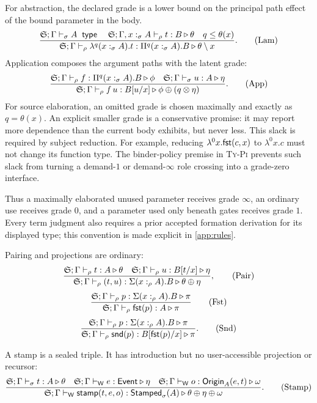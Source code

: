 \documentclass[11pt]{article}
\numberwithin{equation}{section}
\theoremstyle{definition}
\theoremstyle{plain}
\theoremstyle{remark}
\newcommand{\Event}{\mathsf{Event}}
\newcommand{\Origin}{\mathsf{Origin}}
\newcommand{\Stamped}{\mathsf{Stamped}}
\newcommand{\Wit}{\mathsf W}
\newcommand{\absent}{\boldsymbol\infty}
\newcommand{\jtype}{\mathrel{\mathsf{type}}}
\newcommand{\fst}{\AFFst}
\newcommand{\snd}{\AFSnd}
\begin{document}
For abstraction, the declared grade is a lower bound on the principal path
effect of the bound parameter in the body.
\[
\frac{
 \AFDeclSignature;\Gamma\vdash_{\sigma} A\;\jtype
 \quad
 \AFDeclSignature;\Gamma,x:_{\sigma}A\vdash_{\rho} t:B\triangleright\theta
 \quad q\le\theta(x)
}{
 \AFDeclSignature;\Gamma\vdash_{\rho}\lambda^q(x:_{\sigma}A).t:
 \AFDepFun^q(x:_{\sigma}A).B
 \triangleright\theta\setminus x
}.
\tag{Lam}
\]
Application composes the argument paths with the latent grade:
\[
\frac{
 {\mathfrak S};\Gamma\vdash_{\rho} f:\Pi^q(x:_{\sigma}A).B\triangleright\phi
 \quad
 {\mathfrak S};\Gamma\vdash_{\sigma} u:A\triangleright\eta
}{
 {\mathfrak S};\Gamma\vdash_{\rho} f\,u:B[u/x]
 \triangleright\phi\oplus(q\otimes\eta)
}.
\tag{App}
\]
For source elaboration, an omitted grade is chosen maximally and exactly as
\(q=\theta(x)\).  An explicit smaller grade is a conservative promise: it may
report more dependence than the current body exhibits, but never less.  This
slack is required by subject reduction.  For example, reducing
\(\lambda^0x.\fst(c,x)\) to \(\lambda^0x.c\) must not change its function
type.  The binder-policy premise in \textsc{Ty-Pi} prevents such slack from
turning a demand-\(1\) or demand-\(\absent\) role crossing into a grade-zero
interface.

Thus a maximally elaborated unused parameter receives grade \(\absent\), an
ordinary use receives grade \(0\), and a parameter used only beneath gates
receives grade \(1\).
Every term judgment also requires a prior accepted formation derivation for
its displayed type; this convention is made explicit in \cref{app:rules}.

Pairing and projections are ordinary:
\[
\frac{
 {\mathfrak S};\Gamma\vdash_{\rho} t:A\triangleright\theta
 \quad
 {\mathfrak S};\Gamma\vdash_{\rho} u:B[t/x]\triangleright\eta
}{
 {\mathfrak S};\Gamma\vdash_{\rho}(t,u):\Sigma(x:_{\rho}A).B
 \triangleright\theta\oplus\eta
},
\tag{Pair}
\]
\[
\frac{\AFDeclSignature;\Gamma\vdash_{\rho} p:\AFDepPair(x:_{\rho}A).B\triangleright\pi}
{\AFDeclSignature;\Gamma\vdash_{\rho}\fst(p):A\triangleright\pi}
\tag{Fst}
\]
\[
\frac{\AFDeclSignature;\Gamma\vdash_{\rho} p:\AFDepPair(x:_{\rho}A).B\triangleright\pi}
{\AFDeclSignature;\Gamma\vdash_{\rho}\snd(p):B[\fst(p)/x]\triangleright\pi}.
\tag{Snd}
\]

A stamp is a sealed triple.  It has introduction but no user-accessible
projection or recursor:
\[
\frac{
 \AFDeclSignature;\Gamma\vdash_{\sigma} t:A\triangleright\theta
 \quad
 \AFDeclSignature;\Gamma\vdash_{\Wit} e:\Event\triangleright\eta
 \quad
 \AFDeclSignature;\Gamma\vdash_{\Wit} o:\Origin_A(e,t)\triangleright\omega
}{
 \AFDeclSignature;\Gamma\vdash_{\Wit}\mathsf{stamp}(t,e,o):
 \Stamped_\sigma(A)
 \triangleright\theta\oplus\eta\oplus\omega
}.
\tag{Stamp}
\]
\end{document}
